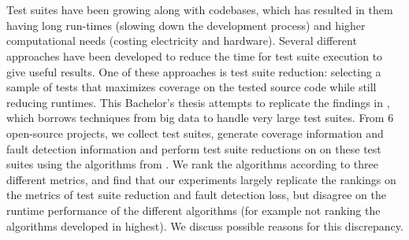 \chapter{\abstractname}

Test suites have been growing along with codebases, which has resulted
in them having long run-times (slowing down the development process) and
higher computational needs (costing electricity and hardware). Several
different approaches have been developed to reduce the time for test suite
execution to give useful results. One of these approaches is test suite
reduction: selecting a sample of tests that maximizes coverage on the
tested source code while still reducing runtimes. This Bachelor's thesis
attempts to replicate the findings in \cite{cruciani2019scalable},
which borrows techniques from big data to handle very large test
suites. From 6 open-source projects, we collect test suites, generate
coverage information and fault detection information and perform
test suite reductions on on these test suites using the algorithms
from \cite{cruciani2019scalable}. We rank the algorithms according
to three different metrics, and find that our experiments largely
replicate the rankings on the metrics of test suite reduction and
fault detection loss, but disagree on the runtime performance of the
different algorithms (for example not ranking the algorithms developed
in \cite{cruciani2019scalable} highest). We discuss possible reasons
for this discrepancy.
